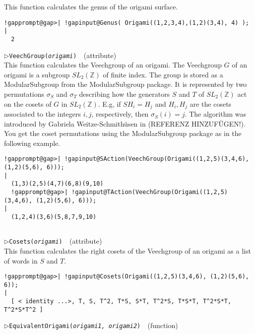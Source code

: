 \documentclass[a4paper,11pt]{report}
\begin{document}
{{{ This function calculates the genus of the origami surface. 
\begin{Verbatim}[commandchars=!@|,fontsize=\small,frame=single,label=Example]
  !gapprompt@gap>| !gapinput@Genus( Origami((1,2,3,4),(1,2)(3,4), 4) );
|
  2
\end{Verbatim}
 \noindent\textcolor{FuncColor}{$\triangleright$\enspace\texttt{VeechGroup({\mdseries\slshape origami})
\label{VeechGroup}
}\hfill{\scriptsize (attribute)}}\\


 This function calculates the Veechgroup of an origami. The Veechgroup $G$ of an origami is a subgroup $SL_2(\mathbb{Z})$ of finite index. The group is stored as a ModularSubgroup from the \textsf{ModularSubgroup} package. It is represented by two permutations $\sigma_S$ and $\sigma_T$ describing how the generators $S$ and $T$ of $SL_2(\mathbb{Z})$ act on the cosets of $G$ in $SL_2(\mathbb{Z})$. E.g, if $SH_i = H_j$ and $H_i,H_j$ are the cosets associated to the integers $i,j$, respectively, then $\sigma_S(i)=j$. The algorithm was introduced by Gabriela Weitze-Schmith{\"u}sen in (REFERENZ
HINZUF{\"U}GEN!). You get the coset permutations using the \textsf{ModularSubgroup} package as in the following example. 
\begin{Verbatim}[commandchars=!@|,fontsize=\small,frame=single,label=Example]
  !gapprompt@gap>| !gapinput@SAction(VeechGroup(Origami((1,2,5)(3,4,6), (1,2)(5,6), 6)));
|
  (1,3)(2,5)(4,7)(6,8)(9,10)
  !gapprompt@gap>| !gapinput@TAction(VeechGroup(Origami((1,2,5)(3,4,6), (1,2)(5,6), 6)));
|
  (1,2,4)(3,6)(5,8,7,9,10)
          
\end{Verbatim}
 \noindent\textcolor{FuncColor}{$\triangleright$\enspace\texttt{Cosets({\mdseries\slshape origami})
\label{Cosets}
}\hfill{\scriptsize (attribute)}}\\


 This function calculates the right cosets of the Veechgroup of an origami as a
list of words in $S$ and $T$. 
\begin{Verbatim}[commandchars=!@|,fontsize=\small,frame=single,label=Example]
  !gapprompt@gap>| !gapinput@Cosets(Origami((1,2,5)(3,4,6), (1,2)(5,6), 6));
|
  [ < identity ...>, T, S, T^2, T*S, S*T, T^2*S, T*S*T, T^2*S*T, T^2*S*T^2 ]
\end{Verbatim}
 \noindent\textcolor{FuncColor}{$\triangleright$\enspace\texttt{EquivalentOrigami({\mdseries\slshape origami1, origami2})
\label{EquivalentOrigami}
}\hfill{\scriptsize (function)}}\\


}}}
\end{document}
